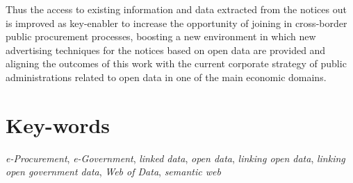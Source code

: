 Thus the access to existing information and data extracted from the notices out is improved as key-enabler 
to increase the opportunity of joining in cross-border public procurement processes, boosting a new environment 
in which new advertising techniques for the notices based on open data are provided and aligning the outcomes 
of this work with the current corporate strategy of public administrations related to open data in one of 
the main economic domains.

\section*{Key-words}

\textit{e-Procurement}, \textit{e-Government}, \textit{linked data}, \textit{open data}, \textit{linking open data}, 
\textit{linking open government data}, \textit{Web of Data}, \textit{semantic web}
